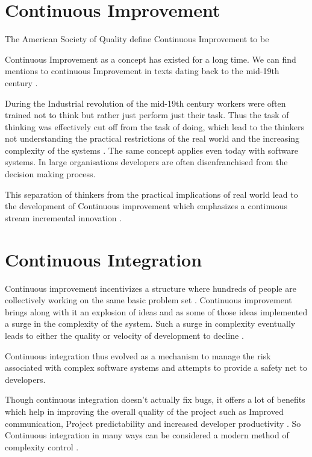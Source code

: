 \documentclass[12pt,conference]{IEEEtran}
\begin{document}
\section*{Continuous Improvement}

The American Society of Quality define Continuous Improvement to be 
 \cite{american_society_for_quality_continuous_????}

Continuous Improvement as a concept has existed for a long time. We can find mentions to continuous Improvement in texts dating back to the mid-19th century \cite{schroeder_americas_????}. 

During the Industrial revolution of the mid-19th century workers were often trained not to think but rather just perform just their task. Thus the task of thinking was effectively cut off from the task of doing, which lead to the thinkers not understanding the practical restrictions of the real world and the increasing complexity of the systems \cite{schroeder_americas_????}. The same concept applies even today with software systems. In large organisations developers are often disenfranchised from the decision making process.

This separation of thinkers from the practical implications of real world lead to the development of Continuous improvement which emphasizes a continuous stream incremental innovation \cite{bessant_rediscovering_1994}.

\section*{Continuous Integration}

Continuous improvement incentivizes a structure where hundreds of people are collectively working on the same basic problem set \cite{bessant_rediscovering_1994}. Continuous improvement brings along with it an explosion of ideas and as some of those ideas implemented a surge in the complexity of the system. Such a surge in complexity eventually leads to either the quality or velocity of development to decline \cite{zaytsev_increasing_2013} . 

Continuous integration thus evolved as a mechanism to manage the risk associated with complex software systems \cite{zaytsev_increasing_2013} and  attempts to provide a safety net \cite{fowler_continuous_2006} to developers. 

Though continuous integration doesn't actually fix bugs, it offers a lot of benefits which help in improving the overall quality of the project such as Improved communication, Project predictability and increased developer productivity \cite{sta_ahl_experienced_2013}. So Continuous integration in many ways can be considered a modern method of complexity control \cite{beck_extreme_2000}.
\end{document}
